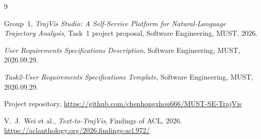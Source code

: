 \documentclass[12pt,a4paper]{report}
\begin{document}
\begin{thebibliography}{9}

 Group~1, \emph{TrajVis Studio: A Self-Service Platform for
  Natural-Language Trajectory Analysis}, Task~1 project proposal, Software
  Engineering, MUST, 2026.

 \emph{User Requirements Specifications Description},
  Software Engineering, MUST, 2026.09.29.

 \emph{Task2-User Requirements Specifications Template},
  Software Engineering, MUST, 2026.09.29.

 Project repository,
  \url{https://github.com/chenhongzhou666/MUST-SE-TrajVis}

 V.~J.~Wei et al., \emph{Text-to-TrajVis}, Findings of ACL,
  2026. \url{https://aclanthology.org/2026.findings-acl.972/}

\end{thebibliography}
\end{document}
